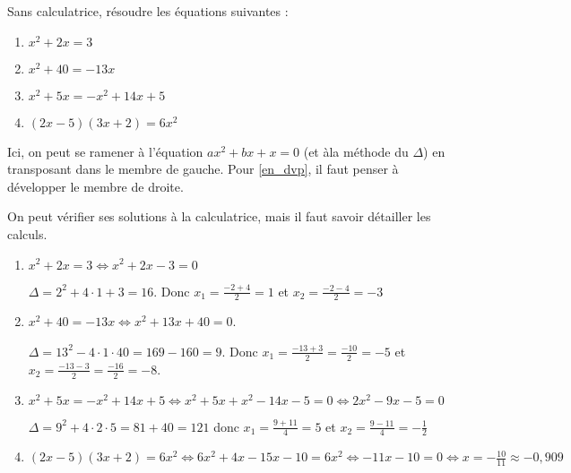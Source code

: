 \begin{exo}[type=solution]
Sans calculatrice, résoudre les équations suivantes :

\begin{multicols}{2}
\begin{enumerate}[label=\bf{\alph*})\,]
\item $x^2+2x=3$
\item $x^2+40 = -13x$
\item $x^2+5x = -x^2+14x +5$
\item $(2x-5)(3x+2)=6x^2$ \label{en_dvp}

\end{enumerate}
\end{multicols}

\begin{sol}
Ici, on peut se ramener à l'équation $ax^2+bx+x=0$ (et àla méthode du $\Delta$) en transposant dans le  membre de gauche. Pour \ref{en_dvp}, il faut penser à développer le membre de droite.

On peut vérifier ses solutions à la calculatrice, mais il faut savoir détailler les calculs.
\end{sol}


\begin{sol*}
\begin{enumerate}[label=\bf{\alph*})\,]
	\item $x^2+2x=3 \iff  x^2+2x-3 =0$
	
	$\Delta =2^2+4 \cdot 1 +3 =16$. Donc $x_1 = \frac{-2+4}{2}=1$ et $x_2 = \frac{-2-4}{2}=-3$
	
	\item $x^2+40 = -13x \iff x^2+13x+40 = 0$.
	
	$\Delta = 13^2-4 \cdot 1 \cdot 40 = 169 - 160 =9$. Donc $x_1=\frac{-13+3}{2} = \frac{-10}{2}=-5$ et $x_2=\frac{-13-3}{2} = \frac{-16}{2}=-8$.
	
	\item $x^2+5x = -x^2+14x +5 \iff x^2+5x+x^2-14x-5 = 0 \iff 2x^2-9x-5=0$
	
	$\Delta = 9^2+4 \cdot 2 \cdot 5 = 81+40 = 121$ donc $x_1=\frac{9+11}{4} = 5$ et $x_2=\frac{9-11}{4} =-\frac{1}{2}$ 
	
	\item $(2x-5)(3x+2)=6x^2 \iff 6x^2+4x-15x-10 = 6x^2 \iff  -11x-10 =0 \iff x = -\frac{10}{11} \approx -0,909$
	
	
	
	
	
\end{enumerate}	
\end{sol*}	


\end{exo}



